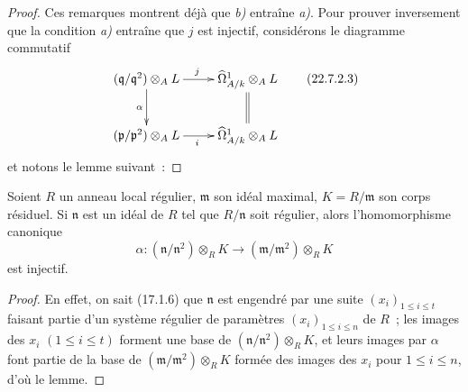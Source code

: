 \begin{proof}
Ces remarques montrent déjà que \emph{b)} entraîne \emph{a)}. Pour prouver inversement que
la condition \emph{a)} entraîne que $j$ est injectif, considérons le diagramme
commutatif
\begin{equation}
\label{0.22.7.2.3-fr}
\xymatrix{
  (\mathfrak q/\mathfrak q^2)\otimes_AL
    \ar[r]^j \ar[d]_\alpha &
  \widehat\Omega^1_{A/k}\otimes_AL \ar@{=}[d] \\
  (\mathfrak p/\mathfrak p^2)\otimes_AL
    \ar[r]_i &
  \widehat\Omega^1_{A/k}\otimes_AL
}
\tag{22.7.2.3}
\end{equation}
et notons le lemme suivant~:
\end{proof}

\begin{lemma}[22.7.2.4]
\label{0.22.7.2.4-fr}
Soient $R$ un anneau local régulier, $\mathfrak m$ son idéal maximal,
$K=R/\mathfrak m$ son corps résiduel. Si $\mathfrak n$ est un idéal de $R$ tel
que $R/\mathfrak n$ soit régulier, alors l'homomorphisme canonique
\begin{equation}
\label{0.22.7.2.5-fr}
  \alpha:(\mathfrak n/\mathfrak n^2)\otimes_RK
  \longrightarrow(\mathfrak m/\mathfrak m^2)\otimes_RK
  \tag{22.7.2.5}
\end{equation}
est injectif.
\end{lemma}

\begin{proof}
En effet, on sait (17.1.6) que $\mathfrak n$ est engendré par une suite
$(x_i)_{1\leq i\leq t}$ faisant partie d'un système régulier de paramètres
$(x_i)_{1\leq i\leq n}$ de $R$~; les images des $x_i$ $(1\leq i\leq t)$
forment une base de $(\mathfrak n/\mathfrak n^2)\otimes_RK$, et leurs images
par $\alpha$ font partie de la base de
$(\mathfrak m/\mathfrak m^2)\otimes_RK$ formée des images des $x_i$ pour
$1\leq i\leq n$, d'où le lemme.
\end{proof}

